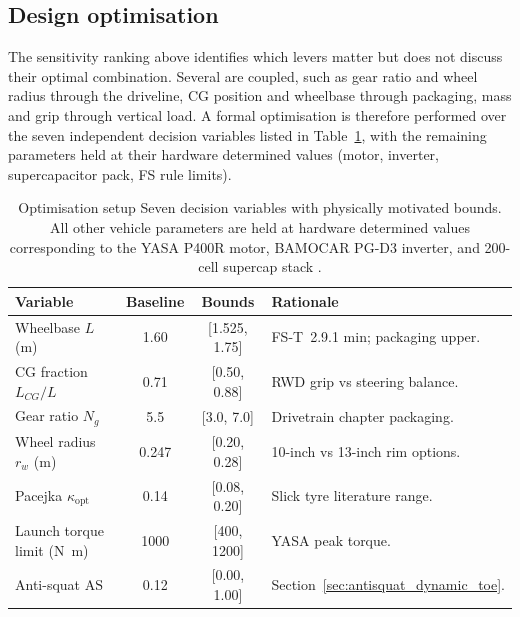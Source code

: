 \documentclass[11pt, a4paper]{report}
\numberwithin{equation}{section}
\begin{document}
\begin{refsection}
\subsection{Design optimisation}
\label{sec:optimisation}

The sensitivity ranking above identifies which levers matter but does
not discuss their optimal combination. Several are coupled, such as gear
ratio and wheel radius through the driveline, CG position and
wheelbase through packaging, mass and grip through vertical load.
A formal optimisation is therefore performed over the seven
independent decision variables listed in
Table~\ref{tab:optim_setup}, with the remaining parameters held at
their hardware determined values (motor, inverter, supercapacitor pack,
FS rule limits).

\begin{table}[H]
\centering
\caption{Optimisation setup Seven decision variables with physically
motivated bounds. All other vehicle parameters are held at
hardware determined values corresponding to the YASA P400R motor, BAMOCAR
PG-D3 inverter, and \num{200}-cell supercap stack
\cite{bamocar_pg, yasa_p400r}.}
\label{tab:optim_setup}
\footnotesize
\begin{tabular}{|l|c|c|l|}
\hline
\textbf{Variable} & \textbf{Baseline} & \textbf{Bounds} & \textbf{Rationale} \\
\hline
Wheelbase $L$ (\si{\metre})               & 1.60 & [1.525, 1.75] & FS-T~2.9.1 min; packaging upper. \\
CG fraction $L_{CG}/L$                    & 0.71 & [0.50, 0.88] & RWD grip vs steering balance. \\
Gear ratio $N_g$                          & 5.5 & [3.0, 7.0] & Drivetrain chapter packaging. \\
Wheel radius $r_w$ (\si{\metre})          & 0.247 & [0.20, 0.28] & 10-inch vs 13-inch rim options. \\
Pacejka $\kappa_\text{opt}$               & 0.14 & [0.08, 0.20] & Slick tyre literature range. \\
Launch torque limit (\si{\newton\metre})  & 1000 & [400, 1200] & YASA peak torque. \\
Anti-squat $\text{AS}$                    & 0.12 & [0.00, 1.00] & Section~\ref{sec:antisquat_dynamic_toe}. \\
\hline
\end{tabular}
\end{table}


\end{refsection}
\end{document}
